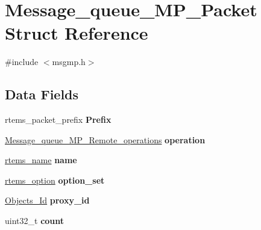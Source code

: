\hypertarget{structMessage__queue__MP__Packet}{}\section{Message\+\_\+queue\+\_\+\+M\+P\+\_\+\+Packet Struct Reference}
\label{structMessage__queue__MP__Packet}


{\ttfamily \#include $<$msgmp.\+h$>$}

\subsection*{Data Fields}
\begin{DoxyCompactItemize}
\item 
\mbox{\label{structMessage__queue__MP__Packet_ad0999eaec4ea8e77430bbd83958ad5c2}} 
rtems\+\_\+packet\+\_\+prefix {\bfseries Prefix}
\item 
\mbox{\label{structMessage__queue__MP__Packet_aa14ec9bad8c92e0c482a109c29caa5c6}} 
\mbox{\hyperlink{msgmp_8h_ab00c9ba4b610c712affa6f7cd7e85399}{Message\+\_\+queue\+\_\+\+M\+P\+\_\+\+Remote\+\_\+operations}} {\bfseries operation}
\item 
\mbox{\label{structMessage__queue__MP__Packet_ad50c6467a57d8e2cffbf6737ee4b4565}} 
\mbox{\hyperlink{group__ClassicTasks_ga55fb63c49f68c0cbd9bee004da15b1fd}{rtems\+\_\+name}} {\bfseries name}
\item 
\mbox{\label{structMessage__queue__MP__Packet_aa6abe40fe3dbd15c2bf56aba944e0df0}} 
\mbox{\hyperlink{group__ClassicOptions_gad26685eb0e60a9650082935c31920e29}{rtems\+\_\+option}} {\bfseries option\+\_\+set}
\item 
\mbox{\label{structMessage__queue__MP__Packet_a51a9b981c8095e27a641f66a738dbdb8}} 
\mbox{\hyperlink{group__RTEMSScoreObject_ga5821f52a51072941bdd603e542d0863e}{Objects\+\_\+\+Id}} {\bfseries proxy\+\_\+id}
\item 
\mbox{\label{structMessage__queue__MP__Packet_ac471bbbafcc1668bc7efd08fe5db1e97}} 
uint32\+\_\+t {\bfseries count}
\item 

\end{DoxyCompactItemize}
